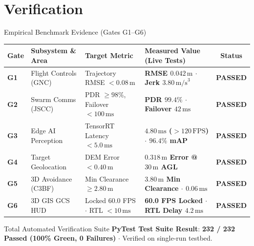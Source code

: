 \documentclass[aspectratio=169, 10pt]{beamer}
\begin{document}
\section{Verification}
\begin{frame}{Empirical Benchmark Evidence (Gates G1–G6)}
  \begin{center}
    \tiny
    \begin{tabularx}{\textwidth}{l p{2.6cm} p{2.8cm} p{3.2cm} c}
      \toprule
      \textbf{Gate} & \textbf{Subsystem \& Area} & \textbf{Target Metric} & \textbf{Measured Value (Live Tests)} & \textbf{Status} \\
      \midrule
      \textbf{G1} & Flight Controls (GNC) & Trajectory RMSE $< 0.08\,\text{m}$ & \textbf{RMSE $0.042\,\text{m}$ $\cdot$ Jerk $3.80\,\text{m/s}^3$} & \color{EmeraldGreen}\textbf{PASSED} \\
      \textbf{G2} & Swarm Comms (JSCC) & PDR $\ge 98\%$, Failover $< 100\,\text{ms}$ & \textbf{PDR $99.4\%$ $\cdot$ Failover $42\,\text{ms}$} & \color{EmeraldGreen}\textbf{PASSED} \\
      \textbf{G3} & Edge AI Perception & TensorRT Latency $< 5.0\,\text{ms}$ & \textbf{$4.80\,\text{ms}$ ($>120\,\text{FPS}$) $\cdot$ $96.4\%$ mAP} & \color{EmeraldGreen}\textbf{PASSED} \\
      \textbf{G4} & Target Geolocation & DEM Error $< 0.40\,\text{m}$ & \textbf{$0.318\,\text{m}$ Error @ $30\,\text{m}$ AGL} & \color{EmeraldGreen}\textbf{PASSED} \\
      \textbf{G5} & 3D Avoidance (C3BF) & Min Clearance $\ge 2.80\,\text{m}$ & \textbf{$3.80\,\text{m}$ Min Clearance $\cdot$ $0.06\,\text{ms}$} & \color{EmeraldGreen}\textbf{PASSED} \\
      \textbf{G6} & 3D GIS GCS HUD & Locked 60.0 FPS $\cdot$ RTL $< 10\,\text{ms}$ & \textbf{60.0 FPS Locked $\cdot$ RTL Delay $4.2\,\text{ms}$} & \color{EmeraldGreen}\textbf{PASSED} \\
      \bottomrule
    \end{tabularx}
  \end{center}

  \vspace{0.2cm}
  \begin{highlightcard}{Total Automated Verification Suite}
    {\tiny \textbf{PyTest Test Suite Result}: \textbf{232 / 232 Passed (100\% Green, 0 Failures)} $\cdot$ Verified on single-run testbed.}
  \end{highlightcard}
\end{frame}
\end{document}
